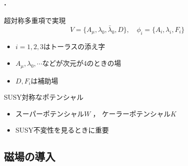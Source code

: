 \documentclass[
  a4paper,uplatex,dvipdfmx,10pt,
  xcolor = {dvipsnames,svgnames},
  hyperref ={colorlinks=true,citecolor=Navy,linkcolor=NavyBlue,urlcolor=purple}
]{beamer}
\begin{document}
\begin{frame}
  \frametitle{\thesection.\thesubsection\ \subsecname}  
  \color{DarkMagenta}

  超対称多重項で実現
  \begin{equation}
    V
    =
    \{
      A_{\mu}
      ,
      \lambda_{0}
      ,
      \bar{\lambda}_{0}
      ,
      D
    \}
    ,\quad
    \phi_{i}
    =
    \{
      A_{i},\lambda_{i},F_{i}
    \}
    \nonumber
  \end{equation}

  \begin{center}
    \begin{itemize}
      \color{DarkMagenta}
      \item 
      $i=1,2,3$はトーラスの添え字
      \item 
      $A_{\mu},\lambda_{0},\cdots$などが次元が4のときの場
      \item 
      $D,F_{i}$は補助場
    \end{itemize}
  \end{center}

  \vspace{10pt}

  SUSY対称なポテンシャル
  \begin{itemize}
    \color{DarkMagenta}
    \item 
    スーパーポテンシャル$W$
    ，
    ケーラーポテンシャル$K$
    \item 
    SUSY不変性を見るときに重要
  \end{itemize}

\end{frame}


\subsection{磁場の導入}
\label{magnetic_flux}
\end{document}
